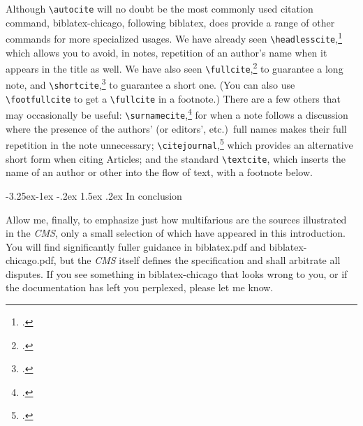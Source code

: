 \documentclass[a4paper,12pt]{article}
\makeatletter
\renewcommand{\section}{\@startsection{section}{1}{\z@}%
                                     {-3.25ex\@plus -1ex \@minus -.2ex}%
                                     {1.5ex \@plus .2ex}%
                                     {\normalfont\large\bfseries}}
\newcommand{\cmd}[1]{\texttt{\textbackslash #1}}
\makeatother
\begin{document}
\begin{refsection}

  Although  \cmd{autocite} will no
  doubt be the most commonly used citation command,
  \textsf{biblatex-chicago}, following \textsf{biblatex}, does provide
  a range of other commands for more specialized usages.  We have
  already seen
  \cmd{headlesscite},\footnote[1]{.} which
  allows you to avoid, in notes, repetition of an \textsf{author's}
  name when it appears in the \textsf{title} as well.  We have also
  seen \cmd{full\-cite},\footnote{.} to
  guarantee a long note, and
  \cmd{shortcite},\footnote{.} to guarantee
  a short one.  (You can also use \cmd{footfullcite} to get a
  \cmd{fullcite} in a footnote.)  There are a few others that may
  occasionally be useful:
  \cmd{surnamecite},\footnote{.} for when a
  note follows a discussion where the presence of the
  \textsf{authors'} (or \textsf{editors'}, etc.)\ full names makes
  their full repetition in the note unnecessary;
  \cmd{citejournal},\footnote{.}
  which provides an alternative short form when citing
  \textsf{Articles}; and the standard \cmd{textcite}, which inserts
  the name of an author or other \textcite{contrib:contrib} into the
  flow of text, with a footnote below.

\end{refsection}

\section{In conclusion}
\label{sec:conclude}

Allow me, finally, to emphasize just how multifarious are the sources
illustrated in the \emph{CMS}, only a small selection of which have
appeared in this introduction.  You will find significantly fuller
guidance in \textsf{biblatex.pdf} and \textsf{biblatex-chicago.pdf},
but the \emph{CMS} itself defines the specification and shall
arbitrate all disputes.  If you see something in
\textsf{biblatex-chicago} that looks wrong to you, or if the
documentation has left you perplexed, please let me know.

\printbibliography[title=\large References]
\end{document}
